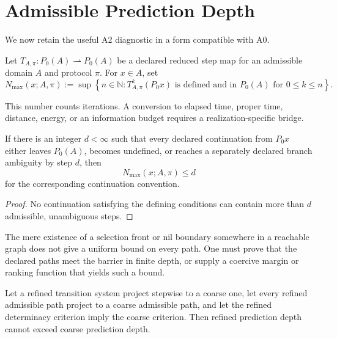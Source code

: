 \documentclass[11pt]{article}
\begin{document}
\section{Admissible Prediction Depth}

We now retain the useful A2 diagnostic in a form compatible with A0.

\begin{definition}
Let $T_{A,\pi}:P_0(A)\rightharpoonup P_0(A)$ be a declared reduced step map for
an admissible domain $A$ and protocol $\pi$.  For $x\in A$, set
\[
N_{\max}(x;A,\pi)
:=
\sup\left\{
n\in\mathbb N:
T_{A,\pi}^{k}(P_0x)\text{ is defined and in }P_0(A)
\text{ for }0\leq k\leq n
\right\}.
\]
\end{definition}

This number counts iterations.  A conversion to elapsed time, proper time,
distance, energy, or an information budget requires a realization-specific
bridge.

\begin{theorem}\label{thm:depth}
If there is an integer $d<\infty$ such that every declared continuation from
$P_0x$ either leaves $P_0(A)$, becomes undefined, or reaches a separately
declared branch ambiguity by step $d$, then
\[
N_{\max}(x;A,\pi)\leq d
\]
for the corresponding continuation convention.
\end{theorem}

\begin{proof}
No continuation satisfying the defining conditions can contain more than
$d$ admissible, unambiguous steps.
\end{proof}

\begin{remark}
The mere existence of a selection front or nil boundary somewhere in a
reachable graph does not give a uniform bound on every path.  One must prove
that the declared paths meet the barrier in finite depth, or supply a
coercive margin or ranking function that yields such a bound.
\end{remark}

\begin{proposition}
\label{prop:refinement}
Let a refined transition system project stepwise to a coarse one, let every
refined admissible path project to a coarse admissible path, and let the
refined determinacy criterion imply the coarse criterion.  Then refined
prediction depth cannot exceed coarse prediction depth.
\end{proposition}
\end{document}
